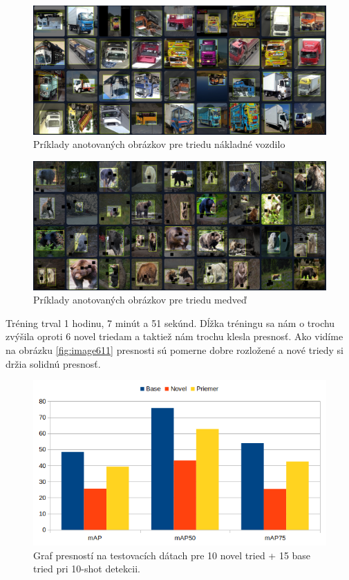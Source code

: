 \begin{figure}[H]
\centering
\includegraphics[width=\textwidth]{images/truck_example_annotations.png}
\caption{Príklady anotovaných obrázkov pre triedu nákladné vozdilo}
\label{fig:image6003}
\end{figure}

\begin{figure}[H]
\centering
\includegraphics[width=\textwidth]{images/bear_example_annotations.png}
\caption{Príklady anotovaných obrázkov pre triedu medveď}
\label{fig:image6004}
\end{figure}

Tréning trval 1 hodinu, 7 minút a 51 sekúnd. Dĺžka tréningu sa nám o trochu zvýšila oproti 6 novel triedam a taktiež nám trochu klesla presnosť. Ako vidíme na obrázku \ref{fig:image611} presnosti sú pomerne dobre rozložené a nové triedy si držia solidnú presnosť. 

\begin{figure}[H]
\centering
\includegraphics[width=\textwidth]{images/10novel_chart.png}
\caption{Graf presností na testovacích dátach pre 10 novel tried + 15 base tried pri 10-shot detekcii.}
\label{fig:image61}
\end{figure}

